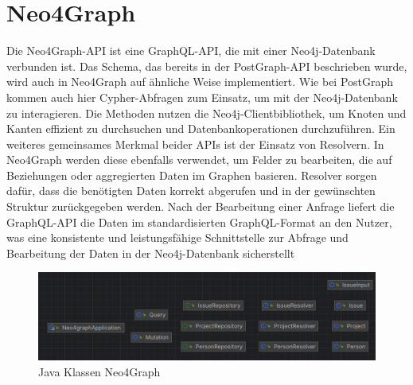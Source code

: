 \section{Neo4Graph} %
\label{sec:neo4graph}
Die Neo4Graph-API ist eine GraphQL-API, die mit einer Neo4j-Datenbank verbunden ist. Das Schema, das bereits in der PostGraph-API beschrieben wurde, wird auch in Neo4Graph auf ähnliche Weise implementiert. Wie bei PostGraph kommen auch hier Cypher-Abfragen zum Einsatz, um mit der Neo4j-Datenbank zu interagieren. Die Methoden nutzen die Neo4j-Clientbibliothek, um Knoten und Kanten effizient zu durchsuchen und Datenbankoperationen durchzuführen.
\noindent
Ein weiteres gemeinsames Merkmal beider APIs ist der Einsatz von Resolvern. In Neo4Graph werden diese ebenfalls verwendet, um Felder zu bearbeiten, die auf Beziehungen oder aggregierten Daten im Graphen basieren. Resolver sorgen dafür, dass die benötigten Daten korrekt abgerufen und in der gewünschten Struktur zurückgegeben werden.
\noindent
Nach der Bearbeitung einer Anfrage liefert die GraphQL-API die Daten im standardisierten GraphQL-Format an den Nutzer, was eine konsistente und leistungsfähige Schnittstelle zur Abfrage und Bearbeitung der Daten in der Neo4j-Datenbank sicherstellt

\begin{figure}[H]
	\centering
	\includegraphics[scale=0.5]{Illustrations/neo4graph.png}
	\caption{Java Klassen Neo4Graph}
\end{figure}
